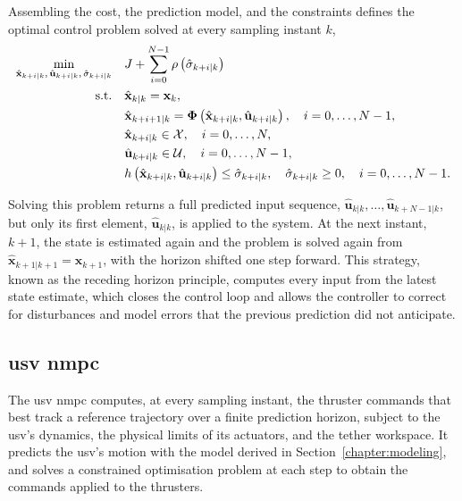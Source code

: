 Assembling the cost, the prediction model, and the constraints defines the optimal control problem solved at every sampling instant $k$,
\begin{align}
    \min_{\hat{\mathbf{x}}_{k+i|k}, \, \hat{\mathbf{u}}_{k+i|k}, \, \hat{\sigma}_{k+i|k}} \quad & J + \sum_{i=0}^{N-1} \rho\left( \hat{\sigma}_{k+i|k} \right) \label{eq:nmpc_ocp_cost} \\
    \text{s.t.} \quad & \hat{\mathbf{x}}_{k|k} = \mathbf{x}_k, \notag \\
    & \hat{\mathbf{x}}_{k+i+1|k} = \boldsymbol\Phi\left( \hat{\mathbf{x}}_{k+i|k}, \hat{\mathbf{u}}_{k+i|k} \right), \quad i = 0, \dots, N-1, \notag \\
    & \hat{\mathbf{x}}_{k+i|k} \in \mathcal{X}, \quad i = 0, \dots, N, \notag \\
    & \hat{\mathbf{u}}_{k+i|k} \in \mathcal{U}, \quad i = 0, \dots, N-1, \notag \\
    & h\left( \hat{\mathbf{x}}_{k+i|k}, \hat{\mathbf{u}}_{k+i|k} \right) \le \hat{\sigma}_{k+i|k}, \quad \hat{\sigma}_{k+i|k} \ge 0, \quad i = 0, \dots, N-1. \notag
\end{align}

Solving this problem returns a full predicted input sequence, $\hat{\mathbf{u}}_{k|k}, \dots, \hat{\mathbf{u}}_{k+N-1|k}$, but only its first element, $\hat{\mathbf{u}}_{k|k}$, is applied to the system. At the next instant, $k+1$, the state is estimated again and the problem is solved again from $\hat{\mathbf{x}}_{k+1|k+1} = \mathbf{x}_{k+1}$, with the horizon shifted one step forward. This strategy, known as the receding horizon principle, computes every input from the latest state estimate, which closes the control loop and allows the controller to correct for disturbances and model errors that the previous prediction did not anticipate.


\subsection{\texorpdfstring{\gls{usv} \gls{nmpc}}{USV NMPC}}
\label{sec:ctrl_usv_mpc}

The \gls{usv} \gls{nmpc} computes, at every sampling instant, the thruster commands that best track a reference trajectory over a finite prediction horizon, subject to the \gls{usv}'s dynamics, the physical limits of its actuators, and the tether workspace. It predicts the \gls{usv}'s motion with the model derived in Section~\ref{chapter:modeling}, and solves a constrained optimisation problem at each step to obtain the commands applied to the thrusters.

